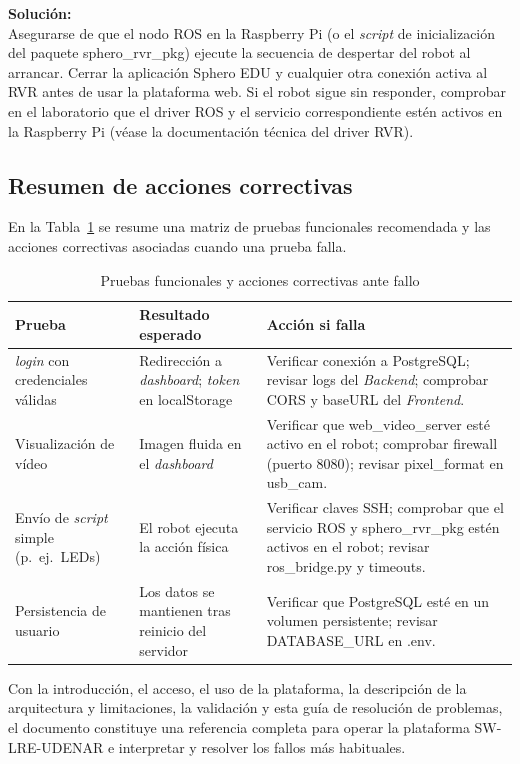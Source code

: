 \documentclass[12pt]{article}
\numberwithin{figure}{section}
\numberwithin{table}{section}
\def\code#1{#1}%
\def\file#1{#1}%
\newcommand{\code}[1]{\textcolor{codeblue}{\url{#1}}}
\newcommand{\file}[1]{\textcolor{darkblue}{\texttt{#1}}}
\begin{document}
\textbf{Solución:}\\
Asegurarse de que el nodo ROS en la Raspberry Pi (o el \textit{script} de inicialización del paquete \code{sphero\_rvr\_pkg}) ejecute la secuencia de despertar del robot al arrancar. Cerrar la aplicación Sphero EDU y cualquier otra conexión activa al RVR antes de usar la plataforma web. Si el robot sigue sin responder, comprobar en el laboratorio que el driver ROS y el servicio correspondiente estén activos en la Raspberry Pi (véase la documentación técnica del driver RVR).


\subsection{Resumen de acciones correctivas}

En la Tabla~\ref{tab:troubleshooting} se resume una matriz de pruebas funcionales recomendada y las acciones correctivas asociadas cuando una prueba falla.

\begin{table}[htbp]
\centering
\caption{Pruebas funcionales y acciones correctivas ante fallo}
\label{tab:troubleshooting}
\begin{tabular}{p{}p{}p{}}
\toprule
\textbf{Prueba} & \textbf{Resultado esperado} & \textbf{Acción si falla} \\
\midrule
\textit{login} con credenciales válidas & Redirección a \textit{dashboard}; \textit{token} en \code{localStorage} & Verificar conexión a PostgreSQL; revisar logs del \textit{Backend}; comprobar CORS y \code{baseURL} del \textit{Frontend}. \\
Visualización de vídeo & Imagen fluida en el \textit{dashboard} & Verificar que \code{web\_video\_server} esté activo en el robot; comprobar firewall (puerto 8080); revisar \code{pixel\_format} en \code{usb\_cam}. \\
Envío de \textit{script} simple (p.\ ej.\ LEDs) & El robot ejecuta la acción física & Verificar claves SSH; comprobar que el servicio ROS y \code{sphero\_rvr\_pkg} estén activos en el robot; revisar \code{ros\_bridge.py} y timeouts. \\
Persistencia de usuario & Los datos se mantienen tras reinicio del servidor & Verificar que PostgreSQL esté en un volumen persistente; revisar \code{DATABASE\_URL} en \file{.env}. \\
\bottomrule
\end{tabular}
\end{table}

Con la introducción, el acceso, el uso de la plataforma, la descripción de la arquitectura y limitaciones, la validación y esta guía de resolución de problemas, el documento constituye una referencia completa para operar la plataforma SW-LRE-UDENAR e interpretar y resolver los fallos más habituales.
\end{document}
